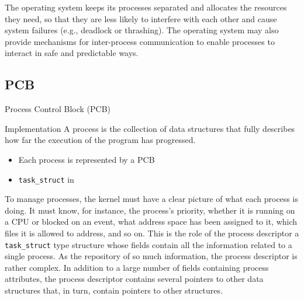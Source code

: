 The operating system keeps its processes separated and allocates the resources they need,
so that they are less likely to interfere with each other and cause system failures (e.g.,
deadlock or thrashing). The operating system may also provide mechanisms for inter-process
communication to enable processes to interact in safe and predictable ways.


\subsection{PCB}
\label{sec:pcb}


\begin{frame}{Process Control Block (PCB)}
  \begin{minipage}{.7\textwidth}
    \begin{block}{Implementation}
        A process is \alert{the collection of data structures} that fully describes how far
        the execution of the program has progressed.
        \begin{itemize}
        \item Each process is represented by a \alert{PCB}
        \item \texttt{task\_struct} in \linux{}
        \end{itemize}
      \end{block}
    \end{minipage}\quad
    \begin{minipage}{.2\textwidth}
      \begin{center}
      \end{center}      
    \end{minipage}
\end{frame}

To manage processes, the kernel must have a clear picture of what each process is
doing. It must know, for instance, the process's priority, whether it is running on a CPU
or blocked on an event, what address space has been assigned to it, which files it is
allowed to address, and so on. This is the role of the process descriptor a
\texttt{task\_struct} type structure whose fields contain all the information related to a
single process. As the repository of so much information, the process descriptor is rather
complex. In addition to a large number of fields containing process attributes, the
process descriptor contains several pointers to other data structures that, in turn,
contain pointers to other structures.


